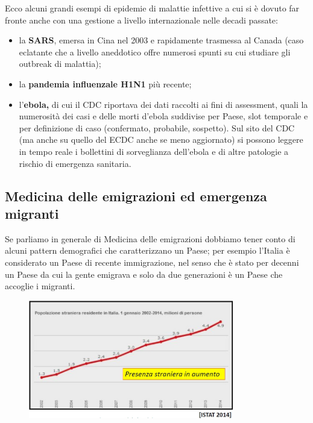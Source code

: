 Ecco alcuni grandi esempi di epidemie di malattie infettive a cui si è
dovuto far fronte anche con una gestione a livello internazionale nelle
decadi passate:

\begin{itemize}
\item
  la \textbf{SARS}, emersa in Cina nel 2003 e rapidamente trasmessa al
  Canada (caso eclatante che a livello aneddotico offre numerosi spunti
  su cui studiare gli outbreak di malattia);
\item
  la \textbf{pandemia influenzale H1N1} più recente;
\item
  l'\textbf{ebola,} di cui il CDC riportava dei dati raccolti ai fini di
  assessment, quali la numerosità dei casi e delle morti d'ebola
  suddivise per Paese, slot temporale e per definizione di caso
  (confermato, probabile, sospetto). Sul sito del CDC (ma anche su
  quello del ECDC anche se meno aggiornato) si possono leggere in tempo
  reale i bollettini di sorveglianza dell'ebola e di altre patologie a
  rischio di emergenza sanitaria.
\end{itemize}

\subsection{Medicina delle emigrazioni ed emergenza migranti}

Se parliamo in generale di Medicina delle emigrazioni dobbiamo tener
conto di alcuni pattern demografici che caratterizzano un Paese; per
esempio l'Italia è considerato un Paese di recente immigrazione, nel
senso che è stato per decenni un Paese da cui la gente emigrava e solo
da due generazioni è un Paese che accoglie i migranti.

\begin{figure}[!ht]
\centering
	\includegraphics[width=0.8\textwidth]{26/image10.jpeg}
	\end{figure}

